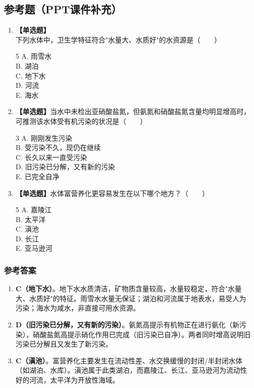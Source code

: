 \documentclass[10pt,a4paper,oneside]{ctexbook}
\begin{document}
\subsection*{参考题（PPT课件补充）}

\begin{enumerate}[leftmargin=*, itemsep=8pt]
    \item \textbf{【单选题】}下列水体中，卫生学特征符合"水量大、水质好"的水资源是（~~~~）
    \begin{multicols}{5}
    A. 雨雪水 \\
    B. 湖泊 \\
    C. 地下水 \\
    D. 河流 \\
    E. 海水
    \end{multicols}
    \item \textbf{【单选题】}当水中未检出亚硝酸盐氮，但氨氮和硝酸盐氮含量均明显增高时，可推测该水体受有机污染的状况是（~~~~）
    \begin{multicols}{3}
    A. 刚刚发生污染 \\
    B. 受污染不久，现仍在继续 \\
    C. 长久以来一直受污染 \\
    D. 旧污染已分解，又有新的污染 \\
    E. 已完全自净
    \end{multicols}
    \item \textbf{【单选题】}水体富营养化更容易发生在以下哪个地方？（~~~~）
    \begin{multicols}{5}
    A. 嘉陵江 \\
    B. 太平洋 \\
    C. 滇池 \\
    D. 长江 \\
    E. 亚马逊河
    \end{multicols}
\end{enumerate}

\subsubsection*{参考答案}
\begin{enumerate}[leftmargin=*, itemsep=5pt]
    \item \textbf{C（地下水）}。地下水水质清洁，矿物质含量较高，水量较稳定，符合"水量大、水质好"的特征。雨雪水水量无保证；湖泊和河流属于地表水，易受人为污染；海水为咸水，非直接可用水资源。
    \item \textbf{D（旧污染已分解，又有新的污染）}。氨氮高提示有机物正在进行氨化（新污染），硝酸盐氮高提示硝化作用已完成（旧污染已自净）。两者同时增高说明旧污染已分解且又发生了新污染。
    \item \textbf{C（滇池）}。富营养化主要发生在流动性差、水交换缓慢的封闭/半封闭水体（如湖泊、水库）。滇池属于此类湖泊，而嘉陵江、长江、亚马逊河为流动性好的河流，太平洋为开放性海域。
\end{enumerate}
\end{document}
